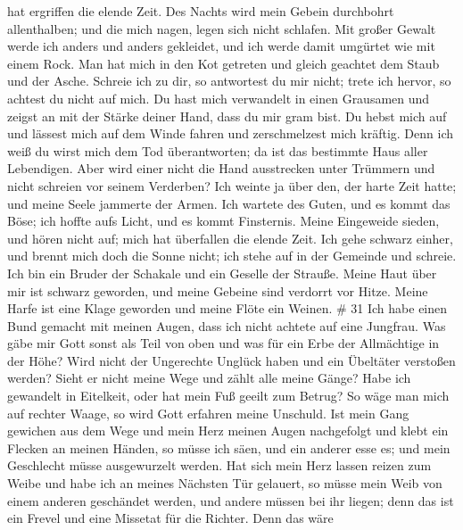 hat ergriffen die elende Zeit.  Des Nachts wird mein Gebein
durchbohrt allenthalben; und die mich nagen, legen sich nicht schlafen.
 Mit großer Gewalt werde ich anders und anders gekleidet,
und ich werde damit umgürtet wie mit einem Rock.  Man hat
mich in den Kot getreten und gleich geachtet dem Staub und der Asche.
 Schreie ich zu dir, so antwortest du mir nicht; trete ich
hervor, so achtest du nicht auf mich.  Du hast mich
verwandelt in einen Grausamen und zeigst an mit der Stärke deiner Hand,
dass du mir gram bist.  Du hebst mich auf und lässest mich
auf dem Winde fahren und zerschmelzest mich kräftig.  Denn
ich weiß du wirst mich dem Tod überantworten; da ist das bestimmte Haus
aller Lebendigen.  Aber wird einer nicht die Hand
ausstrecken unter Trümmern und nicht schreien vor seinem Verderben?
 Ich weinte ja über den, der harte Zeit hatte; und meine
Seele jammerte der Armen.  Ich wartete des Guten, und es
kommt das Böse; ich hoffte aufs Licht, und es kommt Finsternis.
 Meine Eingeweide sieden, und hören nicht auf; mich hat
überfallen die elende Zeit.  Ich gehe schwarz einher, und
brennt mich doch die Sonne nicht; ich stehe auf in der Gemeinde und
schreie.  Ich bin ein Bruder der Schakale und ein Geselle
der Strauße.  Meine Haut über mir ist schwarz geworden, und
meine Gebeine sind verdorrt vor Hitze.  Meine Harfe ist
eine Klage geworden und meine Flöte ein Weinen. \# 31  Ich
habe einen Bund gemacht mit meinen Augen, dass ich nicht achtete auf
eine Jungfrau.  Was gäbe mir Gott sonst als Teil von oben
und was für ein Erbe der Allmächtige in der Höhe?  Wird
nicht der Ungerechte Unglück haben und ein Übeltäter verstoßen werden?
 Sieht er nicht meine Wege und zählt alle meine Gänge?
 Habe ich gewandelt in Eitelkeit, oder hat mein Fuß geeilt
zum Betrug?  So wäge man mich auf rechter Waage, so wird
Gott erfahren meine Unschuld.  Ist mein Gang gewichen aus
dem Wege und mein Herz meinen Augen nachgefolgt und klebt ein Flecken an
meinen Händen,  so müsse ich säen, und ein anderer esse es;
und mein Geschlecht müsse ausgewurzelt werden.  Hat sich
mein Herz lassen reizen zum Weibe und habe ich an meines Nächsten Tür
gelauert,  so müsse mein Weib von einem anderen geschändet
werden, und andere müssen bei ihr liegen;  denn das ist ein
Frevel und eine Missetat für die Richter.  Denn das wäre
